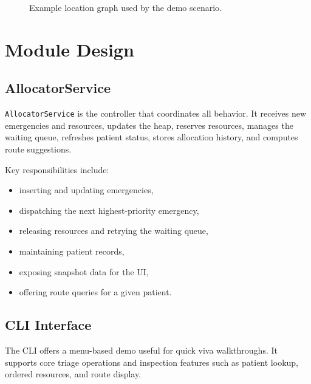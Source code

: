 \documentclass[12pt,a4paper]{report}
\begin{document}
\begin{figure}[H]
\centering
{}
\caption{Example location graph used by the demo scenario.}
\label{fig:graph}
\end{figure}

\chapter{Module Design}
\section{AllocatorService}
\texttt{AllocatorService} is the controller that coordinates all behavior. It receives new emergencies and resources, updates the heap, reserves resources, manages the waiting queue, refreshes patient status, stores allocation history, and computes route suggestions.

Key responsibilities include:
\begin{itemize}[leftmargin=1.2cm]
  \item inserting and updating emergencies,
  \item dispatching the next highest-priority emergency,
  \item releasing resources and retrying the waiting queue,
  \item maintaining patient records,
  \item exposing snapshot data for the UI,
  \item offering route queries for a given patient.
\end{itemize}

\section{CLI Interface}
The CLI offers a menu-based demo useful for quick viva walkthroughs. It supports core triage operations and inspection features such as patient lookup, ordered resources, and route display.
\end{document}
